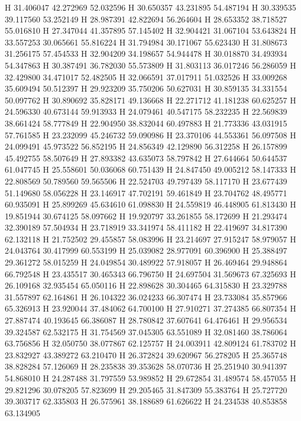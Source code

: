 \documentclass{article}
\begin{document}
H 31.406047 42.272969 52.032596
H 30.650357 43.231895 54.487194
H 30.339535 39.117560 53.252149
H 28.987391 42.822694 56.264604
H 28.653352 38.718527 55.016810
H 27.347044 41.357895 57.145402
H 32.904421 31.067104 53.643824
H 33.557253 30.065661 55.816224
H 31.794984 30.171067 55.623430
H 31.808673 31.256175 57.454533
H 32.904209 34.198657 54.944478
H 30.018870 34.493934 54.347863
H 30.387491 36.782030 55.573809
H 31.803113 36.017246 56.286059
H 32.429800 34.471017 52.482505
H 32.066591 37.017911 51.032526
H 33.009268 35.609494 50.512397
H 29.923209 35.750206 50.627031
H 30.859135 34.331554 50.097762
H 30.890692 35.828171 49.136668
H 22.271712 41.181238 60.625257
H 24.596330 40.673144 59.913933
H 24.079461 40.547175 58.232235
H 22.569839 38.661424 58.777849
H 22.904950 38.832044 60.497883
H 21.773336 43.031915 57.761585
H 23.232099 45.246732 59.090986
H 23.370106 44.553361 56.097508
H 24.099491 45.973522 56.852195
H 24.856349 42.129890 56.312258
H 26.157899 45.492755 58.507649
H 27.893382 43.635073 58.797842
H 27.644664 50.644537 61.047745
H 25.558601 50.036068 60.751439
H 24.847450 49.005212 58.147333
H 22.808569 50.789560 59.565506
H 22.524703 49.797439 58.117170
H 23.677439 51.149680 58.056228
H 23.146917 47.702191 59.461849
H 23.704762 48.495771 60.935091
H 25.899269 45.634610 61.098830
H 24.559819 46.448905 61.813430
H 19.851944 30.674125 58.097662
H 19.920797 33.261855 58.172699
H 21.293474 32.390189 57.504934
H 23.718919 33.341974 58.411182
H 22.419697 34.817390 62.132118
H 21.752502 29.455857 58.083996
H 23.214697 27.915247 58.979057
H 24.043764 30.417999 60.553199
H 25.039082 28.977091 60.396900
H 25.388497 29.361272 58.015259
H 24.049854 30.489922 57.918057
H 26.469464 29.948864 66.792548
H 23.435517 30.465343 66.796750
H 24.697504 31.569673 67.325693
H 26.109168 32.935454 65.050116
H 22.898628 30.304465 64.315830
H 23.329788 31.557897 62.164861
H 26.104322 36.024233 66.307474
H 23.733084 35.857966 65.326913
H 23.920044 37.484062 64.700100
H 27.910271 37.274385 66.807354
H 27.887474 40.193645 66.386087
H 28.780842 37.607641 64.476461
H 29.956534 39.324587 62.532175
H 31.754569 37.045305 63.551089
H 32.081460 38.786064 63.756856
H 32.050750 38.077867 62.125757
H 24.003911 42.809124 61.783702
H 23.832927 43.389272 63.210470
H 26.372824 39.620967 56.278205
H 25.365748 38.828284 57.126069
H 28.235838 39.353628 58.070736
H 25.251940 30.941397 54.868010
H 24.287488 31.797559 53.989852
H 29.672854 31.489574 58.457055
H 29.821296 30.078205 57.823699
H 29.205465 31.847309 55.383764
H 25.727720 39.303717 62.335803
H 26.575961 38.188689 61.626622
H 24.234538 40.853858 63.134905
\end{document}
